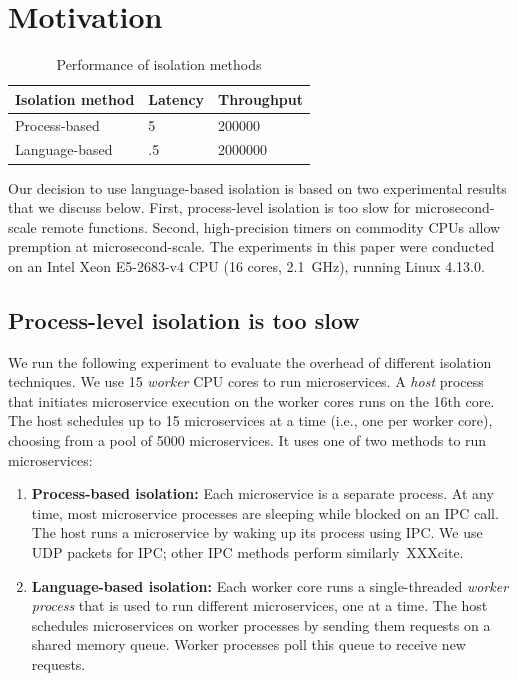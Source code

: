 \section{Motivation}
\label{sec:motive}

\begin{table}
\begin{center}
\small
\begin{tabular}{lll}
\textbf{Isolation method} & \textbf{Latency} & \textbf{Throughput} \\
\midrule
Process-based & 5 & 200000 \\
Language-based & .5 & 2000000 \\
\end{tabular}
\caption{Performance of isolation methods}
\label{tab:isolation_methods}
\end{center}
\end{table}

Our decision to use language-based isolation is based on two experimental
results that we discuss below. First, process-level isolation is too slow for
microsecond-scale remote functions. Second, high-precision timers on commodity
CPUs allow premption at microsecond-scale. The experiments in this paper were
conducted on an Intel Xeon E5-2683-v4 CPU (16 cores, 2.1~GHz), running
Linux 4.13.0.

\subsection{Process-level isolation is too slow}
We run the following experiment to evaluate the overhead of different isolation
techniques. We use 15 \emph{worker} CPU cores to run microservices. A \emph{host}
process that initiates microservice execution on the worker cores runs on the
16th core. The host schedules up to 15 microservices at a time (i.e., one
per worker core), choosing from a pool of 5000 microservices. It uses one of two
methods to run microservices:

\begin{enumerate}
\item \textbf{Process-based isolation:} Each microservice is a separate process.
At any time, most microservice processes are sleeping while blocked on an IPC
call. The host runs a microservice by waking up its process using IPC. We use
UDP packets for IPC; other IPC methods perform similarly~XXXcite.
\item \textbf{Language-based isolation:} Each worker core runs a single-threaded
\emph{worker process} that is used to run different microservices, one at a time.
The host schedules microservices on worker processes by sending them requests on
a shared memory queue. Worker processes poll this queue to receive new requests.
\end{enumerate}


